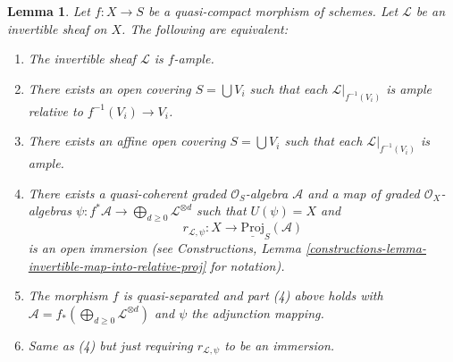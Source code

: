 \documentclass[10pt,a4paper]{amsart}
\theoremstyle{plain}
\newtheorem{lemma}[subsection]{Lemma}
\theoremstyle{definition}
\theoremstyle{remark}
\numberwithin{equation}{subsection}
\newenvironment{reference}{\comment}{\endcomment}
\begin{document}
\begin{lemma}
\label{lemma-characterize-relatively-ample}
\begin{reference}
\cite[II, Proposition 4.6.3]{EGA}
\end{reference}
Let $f : X \to S$ be a quasi-compact morphism of schemes.
Let $\mathcal{L}$ be an invertible sheaf on $X$.
The following are equivalent:
\begin{enumerate}
\item The invertible sheaf $\mathcal{L}$ is $f$-ample.
\item There exists an open covering $S = \bigcup V_i$
such that each $\mathcal{L}|_{f^{-1}(V_i)}$ is ample
relative to $f^{-1}(V_i) \to V_i$.
\item There exists an affine open covering $S = \bigcup V_i$
such that each $\mathcal{L}|_{f^{-1}(V_i)}$ is ample.
\item There exists a quasi-coherent graded $\mathcal{O}_S$-algebra
$\mathcal{A}$ and a map of graded $\mathcal{O}_X$-algebras
$\psi : f^*\mathcal{A} \to \bigoplus_{d \geq 0} \mathcal{L}^{\otimes d}$
such that $U(\psi) = X$ and
$$
r_{\mathcal{L}, \psi} :
X
\longrightarrow
\underline{\text{Proj}}_S(\mathcal{A})
$$
is an open immersion (see Constructions, Lemma
\ref{constructions-lemma-invertible-map-into-relative-proj} for notation).
\item The morphism $f$ is quasi-separated and
part (4) above holds with
$\mathcal{A} = f_*(\bigoplus_{d \geq 0} \mathcal{L}^{\otimes d})$
and $\psi$ the adjunction mapping.
\item Same as (4) but just requiring $r_{\mathcal{L}, \psi}$
to be an immersion.
\end{enumerate}
\end{lemma}
\end{document}
